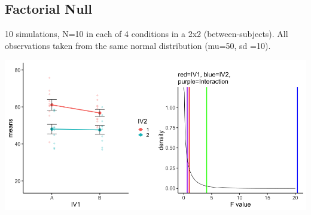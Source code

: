 \documentclass[]{book}
\begin{document}
\hypertarget{factorial-null}{%
\subsection{Factorial Null}\label{factorial-null}}

10 simulations, N=10 in each of 4 conditions in a 2x2 (between-subjects). All observations taken from the same normal distribution (mu=50, sd =10).

\includegraphics{gifs/FactorialNull.gif}
\end{document}
